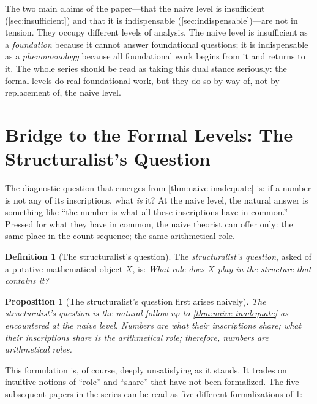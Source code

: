 \documentclass[12pt]{article}
\newtheorem{proposition}[theorem]{Proposition}
\theoremstyle{definition}
\newtheorem{definition}[theorem]{Definition}
\theoremstyle{remark}
\begin{document}
The two main claims of the paper---that the naive level is insufficient
(\cref{sec:insufficient}) and that it is indispensable
(\cref{sec:indispensable})---are not in tension. They occupy different
levels of analysis. The naive level is insufficient as a \emph{foundation}
because it cannot answer foundational questions; it is indispensable as
a \emph{phenomenology} because all foundational work begins from it and
returns to it. The whole series should be read as taking this dual stance
seriously: the formal levels do real foundational work, but they do so
by way of, not by replacement of, the naive level.

\section{Bridge to the Formal Levels: The Structuralist's Question}
\label{sec:bridge}

The diagnostic question that emerges from \cref{thm:naive-inadequate} is:
if a number is not any of its inscriptions, what \emph{is} it? At the
naive level, the natural answer is something like ``the number is what
all these inscriptions have in common.'' Pressed for what they have in
common, the naive theorist can offer only: the same place in the count
sequence; the same arithmetical role.

\begin{definition}[The structuralist's question]
\label{def:structuralist-question}
The \emph{structuralist's question}, asked of a putative mathematical
object $X$, is: \emph{What role does $X$ play in the structure that
contains it?}
\end{definition}

\begin{proposition}[The structuralist's question first arises naively]
\label{prop:structuralist-naive}
The structuralist's question is the natural follow-up to
\cref{thm:naive-inadequate} as encountered at the naive level. Numbers
are what their inscriptions share; what their inscriptions share is the
arithmetical role; therefore, numbers are arithmetical roles.
\end{proposition}

This formulation is, of course, deeply unsatisfying as it stands. It
trades on intuitive notions of ``role'' and ``share'' that have not been
formalized. The five subsequent papers in the series can be read as
five different formalizations of \cref{prop:structuralist-naive}:
\end{document}
